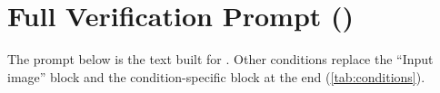 \section{Full Verification Prompt ()}
\label{app:prompt}
The prompt below is the text built for . Other conditions replace the
``Input image'' block and the condition-specific block at the end
(\cref{tab:conditions}).

